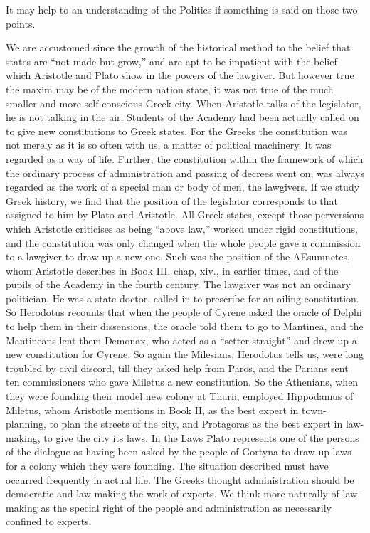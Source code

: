 It may help to an understanding of the Politics if something is said on
those two points.

We are accustomed since the growth of the historical method to the belief
that states are ``not made but grow,'' and are apt to be impatient with the
belief which Aristotle and Plato show in the powers of the lawgiver. But
however true the maxim may be of the modern nation state, it was not true
of the much smaller and more self-conscious Greek city. When Aristotle
talks of the legislator, he is not talking in the air. Students of the
Academy had been actually called on to give new constitutions to Greek
states. For the Greeks the constitution was not merely as it is so often
with us, a matter of political machinery. It was regarded as a way of
life. Further, the constitution within the framework of which the ordinary
process of administration and passing of decrees went on, was always
regarded as the work of a special man or body of men, the lawgivers. If we
study Greek history, we find that the position of the legislator
corresponds to that assigned to him by Plato and Aristotle. All Greek
states, except those perversions which Aristotle criticises as being
``above law,'' worked under rigid constitutions, and the constitution was
only changed when the whole people gave a commission to a lawgiver to draw
up a new one. Such was the position of the AEsumnetes, whom Aristotle
describes in Book III. chap, xiv., in earlier times, and of the pupils of
the Academy in the fourth century. The lawgiver was not an ordinary
politician. He was a state doctor, called in to prescribe for an ailing
constitution. So Herodotus recounts that when the people of Cyrene asked
the oracle of Delphi to help them in their dissensions, the oracle told
them to go to Mantinea, and the Mantineans lent them Demonax, who acted as
a ``setter straight'' and drew up a new constitution for Cyrene. So again
the Milesians, Herodotus tells us, were long troubled by civil discord,
till they asked help from Paros, and the Parians sent ten commissioners
who gave Miletus a new constitution. So the Athenians, when they were
founding their model new colony at Thurii, employed Hippodamus of Miletus,
whom Aristotle mentions in Book II, as the best expert in town-planning,
to plan the streets of the city, and Protagoras as the best expert in
law-making, to give the city its laws. In the Laws Plato represents one of
the persons of the dialogue as having been asked by the people of Gortyna
to draw up laws for a colony which they were founding. The situation
described must have occurred frequently in actual life. The Greeks thought
administration should be democratic and law-making the work of experts. We
think more naturally of law-making as the special right of the people and
administration as necessarily confined to experts.


